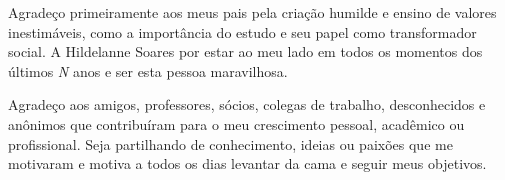 \begin{agradecimentos}
	Agradeço primeiramente aos meus pais pela criação humilde e ensino de valores inestimáveis, como a importância do estudo e seu papel como transformador social. A Hildelanne Soares por estar ao meu lado em todos os momentos dos últimos \emph{N} anos e ser esta pessoa maravilhosa.
    
    Agradeço aos amigos, professores, sócios, colegas de trabalho, desconhecidos e anônimos que contribuíram para o meu crescimento pessoal, acadêmico ou profissional. Seja partilhando de conhecimento, ideias ou paixões que me motivaram e motiva a todos os dias levantar da cama e seguir meus objetivos.
    
\end{agradecimentos}